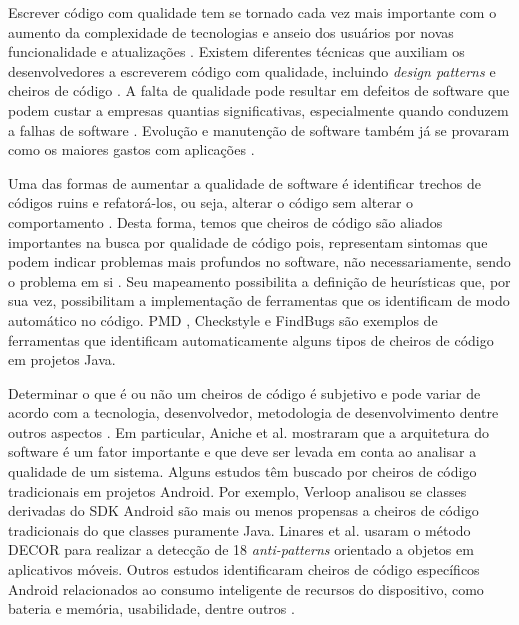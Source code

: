 Escrever código com qualidade tem se tornado cada vez mais importante com o aumento da complexidade de tecnologias e anseio dos usuários por novas funcionalidade e atualizações \cite{Hecht2015,MobileSmells:13}. Existem diferentes técnicas que auxiliam os desenvolvedores a escreverem código com qualidade, incluindo \textit{design patterns} \cite{gof} e cheiros de código \cite{Refactoring:99}. A falta de qualidade pode resultar em defeitos de software que podem custar a empresas quantias significativas, especialmente quando conduzem a falhas de software \cite{Nagappan:2005, briand1993modeling}. Evolução e manutenção de software também já se provaram como os maiores gastos com aplicações \cite{RefactoringAndImprovements:10}.

Uma das formas de aumentar a qualidade de software é identificar trechos de códigos ruins e refatorá-los, ou seja, alterar o código sem alterar o comportamento \cite{Refactoring:99}. Desta forma, temos que cheiros de código são aliados importantes na busca por qualidade de código pois, representam sintomas que podem indicar problemas mais profundos no software, não necessariamente, sendo o problema em si \cite{CodeSmell:06}. Seu mapeamento possibilita a definição de heurísticas que, por sua vez, possibilitam a implementação de ferramentas que os identificam de modo automático no código. PMD \cite{PMD2016}, Checkstyle e FindBugs são exemplos de ferramentas que identificam automaticamente alguns tipos de cheiros de código em projetos Java.

Determinar o que é ou não um cheiros de código é subjetivo e pode variar de acordo com a tecnologia, desenvolvedor, metodologia de desenvolvimento dentre outros aspectos \cite{WikiCodeSmell}. Em particular, Aniche et al. \cite{MvcSmells:16,aniche2016satt} mostraram que a arquitetura do software é um fator importante e que deve ser levada em conta ao analisar a qualidade de um sistema. Alguns estudos têm buscado por cheiros de código tradicionais em projetos Android. Por exemplo, Verloop \cite{MobileSmells:13} analisou se classes derivadas do SDK Android são mais ou menos propensas a cheiros de código tradicionais do que classes puramente Java. Linares et al. \cite{DomainMatters} usaram o método DECOR para realizar a detecção de 18 \textit{anti-patterns} orientado a objetos em aplicativos móveis. Outros estudos identificaram cheiros de código específicos Android relacionados ao consumo inteligente de recursos do dispositivo, como bateria e memória, usabilidade, dentre outros \cite{EnergyAndroidSmells, ReimannBrylski2013}. 

